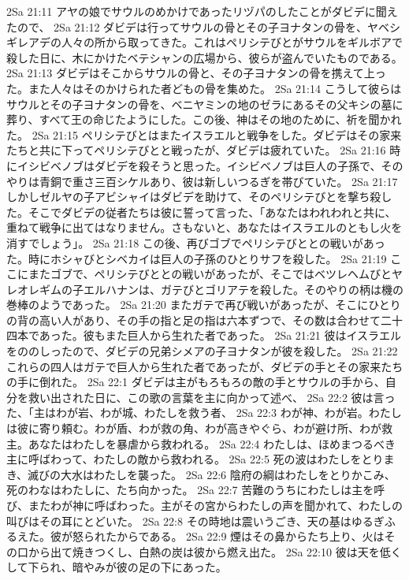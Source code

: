 2Sa 21:11  アヤの娘でサウルのめかけであったリヅパのしたことがダビデに聞えたので、
2Sa 21:12  ダビデは行ってサウルの骨とその子ヨナタンの骨を、ヤベシギレアデの人々の所から取ってきた。これはペリシテびとがサウルをギルボアで殺した日に、木にかけたベテシャンの広場から、彼らが盗んでいたものである。
2Sa 21:13  ダビデはそこからサウルの骨と、その子ヨナタンの骨を携えて上った。また人々はそのかけられた者どもの骨を集めた。
2Sa 21:14  こうして彼らはサウルとその子ヨナタンの骨を、ベニヤミンの地のゼラにあるその父キシの墓に葬り、すべて王の命じたようにした。この後、神はその地のために、祈を聞かれた。
2Sa 21:15  ペリシテびとはまたイスラエルと戦争をした。ダビデはその家来たちと共に下ってペリシテびとと戦ったが、ダビデは疲れていた。
2Sa 21:16  時にイシビベノブはダビデを殺そうと思った。イシビベノブは巨人の子孫で、そのやりは青銅で重さ三百シケルあり、彼は新しいつるぎを帯びていた。
2Sa 21:17  しかしゼルヤの子アビシャイはダビデを助けて、そのペリシテびとを撃ち殺した。そこでダビデの従者たちは彼に誓って言った、「あなたはわれわれと共に、重ねて戦争に出てはなりません。さもないと、あなたはイスラエルのともし火を消すでしょう」。
2Sa 21:18  この後、再びゴブでペリシテびととの戦いがあった。時にホシャびとシベカイは巨人の子孫のひとりサフを殺した。
2Sa 21:19  ここにまたゴブで、ペリシテびととの戦いがあったが、そこではベツレヘムびとヤレオレギムの子エルハナンは、ガテびとゴリアテを殺した。そのやりの柄は機の巻棒のようであった。
2Sa 21:20  またガテで再び戦いがあったが、そこにひとりの背の高い人があり、その手の指と足の指は六本ずつで、その数は合わせて二十四本であった。彼もまた巨人から生れた者であった。
2Sa 21:21  彼はイスラエルをののしったので、ダビデの兄弟シメアの子ヨナタンが彼を殺した。
2Sa 21:22  これらの四人はガテで巨人から生れた者であったが、ダビデの手とその家来たちの手に倒れた。
2Sa 22:1  ダビデは主がもろもろの敵の手とサウルの手から、自分を救い出された日に、この歌の言葉を主に向かって述べ、
2Sa 22:2  彼は言った、「主はわが岩、わが城、わたしを救う者、
2Sa 22:3  わが神、わが岩。わたしは彼に寄り頼む。わが盾、わが救の角、わが高きやぐら、わが避け所、わが救主。あなたはわたしを暴虐から救われる。
2Sa 22:4  わたしは、ほめまつるべき主に呼ばわって、わたしの敵から救われる。
2Sa 22:5  死の波はわたしをとりまき、滅びの大水はわたしを襲った。
2Sa 22:6  陰府の綱はわたしをとりかこみ、死のわなはわたしに、たち向かった。
2Sa 22:7  苦難のうちにわたしは主を呼び、またわが神に呼ばわった。主がその宮からわたしの声を聞かれて、わたしの叫びはその耳にとどいた。
2Sa 22:8  その時地は震いうごき、天の基はゆるぎふるえた。彼が怒られたからである。
2Sa 22:9  煙はその鼻からたち上り、火はその口から出て焼きつくし、白熱の炭は彼から燃え出た。
2Sa 22:10  彼は天を低くして下られ、暗やみが彼の足の下にあった。
